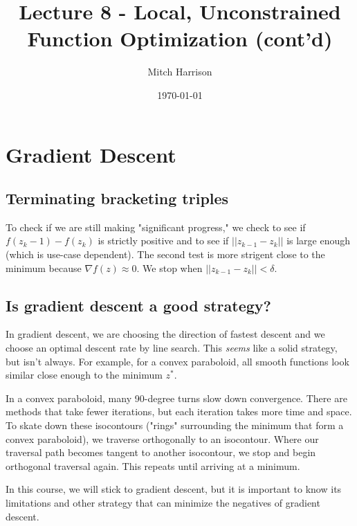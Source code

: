 \documentclass[titlepage, 12pt, leqno]{article}
\title{\Huge{Lecture 8 - Local, Unconstrained Function Optimization (cont'd)}}
\author{\large{Mitch Harrison}}
\date{\today}
\begin{document}
\setlength{\parskip}{1\baselineskip}
\setlength{\parindent}{15pt}
\maketitle
\tableofcontents
\newpage


\section{Gradient Descent}

\subsection{Terminating bracketing triples}
To check if we are still making "significant progress," we check to see if
$f(z_{k}-1) - f(z_{k})$ is strictly positive and to see if
$||z_{k-1}-z_{k}||$ is large enough (which is use-case dependent). The second
test is more strigent close to the minimum because $\nabla f(z)\approx0$. We
stop when $||z_{k-1}-z_{k}||<\delta$.

\subsection{Is gradient descent a good strategy?}
In gradient descent, we are choosing the direction of fastest descent and we 
choose an optimal descent rate by line search. This \textit{seems} like a solid
strategy, but isn't always. For example, for a convex paraboloid, all smooth
functions look similar close enough to the minimum $z^{*}$.

In a convex paraboloid, many 90-degree turns slow down convergence. There are
methods that take fewer iterations, but each iteration takes more time and
space. To skate down these isocontours ("rings" surrounding the minimum that 
form a convex paraboloid), we traverse orthogonally to an isocontour. Where our
traversal path becomes tangent to another isocontour, we stop and begin 
orthogonal traversal again. This repeats until arriving at a minimum.

\begin{note}
    In this course, we will stick to gradient descent, but it is important to
    know its limitations and other strategy that can minimize the negatives of
    gradient descent.
\end{note}
\end{document}
